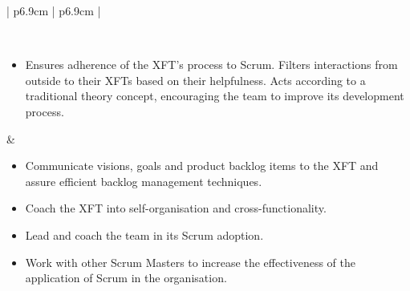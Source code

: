 \begin{table}[t]
\begin{tabularx}{\textwidth}{ | p{6.9cm} | p{6.9cm} | }
   \\ \hline
   
   
   \\ \hline 
   
   \begin{itemize}[label={}, leftmargin=*, topsep=0pt, itemsep=0pt, partopsep=0pt]
     \item Ensures adherence of the \ac{XFT}'s process to Scrum. Filters interactions from outside to their \acp{XFT} based on their helpfulness. Acts according to a traditional theory concept, encouraging the team to improve its development process.
   \end{itemize} & 
   
   \begin{itemize}[label={}, leftmargin=*, topsep=0pt, itemsep=0pt, partopsep=0pt]
     \item Communicate visions, goals and product backlog items to the \ac{XFT} and assure efficient backlog management techniques.
     \item Coach the \ac{XFT} into self-organisation and cross-functionality.
     \item Lead and coach the team in its Scrum adoption.
     \item Work with other Scrum Masters to increase the effectiveness of the application of Scrum in the organisation.
   \end{itemize} 
   
   \\ \hline

  \end{tabularx}
  \caption{Role descriptions}
\end{table}
